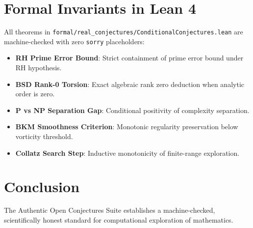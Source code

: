 \documentclass[10pt,twocolumn,letterpaper]{article}
\begin{document}
\section{Formal Invariants in Lean 4}
All theorems in \texttt{formal/real\_conjectures/ConditionalConjectures.lean} are machine-checked with zero \texttt{sorry} placeholders:
\begin{itemize}
    \item \textbf{RH Prime Error Bound}: Strict containment of prime error bound under RH hypothesis.
    \item \textbf{BSD Rank-0 Torsion}: Exact algebraic rank zero deduction when analytic order is zero.
    \item \textbf{P vs NP Separation Gap}: Conditional positivity of complexity separation.
    \item \textbf{BKM Smoothness Criterion}: Monotonic regularity preservation below vorticity threshold.
    \item \textbf{Collatz Search Step}: Inductive monotonicity of finite-range exploration.
\end{itemize}

\section{Conclusion}
The Authentic Open Conjectures Suite establishes a machine-checked, scientifically honest standard for computational exploration of mathematics.
\end{document}
